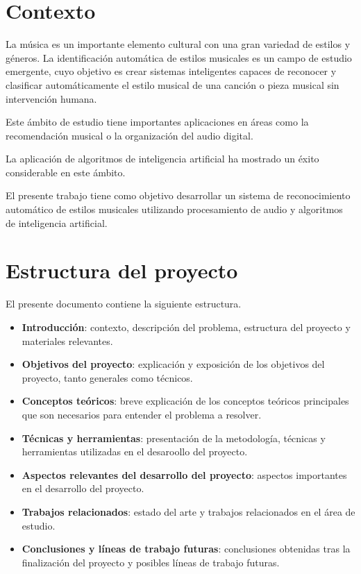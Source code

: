 
\section{Contexto}

La música es un importante elemento cultural con una gran variedad de estilos y géneros.
La identificación automática de estilos musicales es un campo de estudio emergente, cuyo objetivo es crear sistemas inteligentes capaces de reconocer y clasificar automáticamente el estilo musical de una canción o pieza musical sin intervención humana. 

Este ámbito de estudio tiene importantes aplicaciones en áreas como la recomendación musical o la organización del audio digital.

La aplicación de algoritmos de inteligencia artificial ha mostrado un éxito considerable en este ámbito.

El presente trabajo tiene como objetivo desarrollar un sistema de reconocimiento automático de estilos musicales utilizando procesamiento de audio y algoritmos de inteligencia artificial.

\section{Estructura del proyecto}
El presente documento contiene la siguiente estructura.

\begin{itemize}
\tightlist
\item \textbf{Introducción}: contexto, descripción del problema, estructura del proyecto y materiales relevantes.
\item \textbf{Objetivos del proyecto}: explicación y exposición de los objetivos del proyecto, tanto generales como técnicos.
\item \textbf{Conceptos teóricos}: breve explicación de los conceptos teóricos principales que son necesarios para entender el problema a resolver.
\item \textbf{Técnicas y herramientas}: presentación de la metodología, técnicas y herramientas utilizadas en el desaroollo del proyecto.
\item \textbf{Aspectos relevantes del desarrollo del proyecto}: aspectos importantes en el desarrollo del proyecto.
\item \textbf{Trabajos relacionados}: estado del arte y trabajos relacionados en el área de estudio.
\item \textbf{Conclusiones y líneas de trabajo futuras}: conclusiones obtenidas tras la finalización del proyecto y posibles líneas de trabajo futuras.
\end{itemize}

